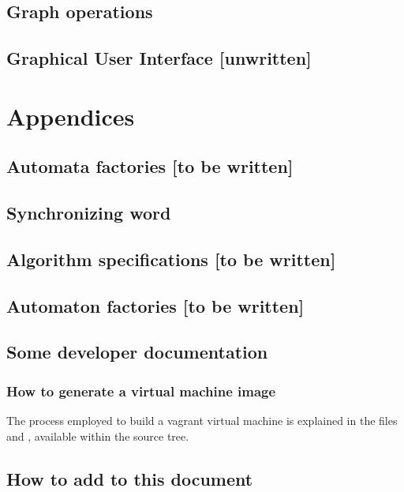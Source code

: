 \chapter{Graph operations}
\label{graph-operations}


\chapter{Graphical User Interface [unwritten]}

\part{Appendices}
\begin{appendices}
\chapter{Automata factories [to be written]}

\chapter{Synchronizing word}


\chapter{Algorithm specifications [to be written]}

\chapter{Automaton factories [to be written]}

\chapter{Some developer documentation}


\section{How to generate a virtual machine image}
The process employed to build a vagrant virtual machine
is explained in the files
and
, available within the source tree.


\chapter{How to add to this document}


\end{appendices}


\backmatter

\cleardoublepage

%

\cleardoublepage
\printindex


